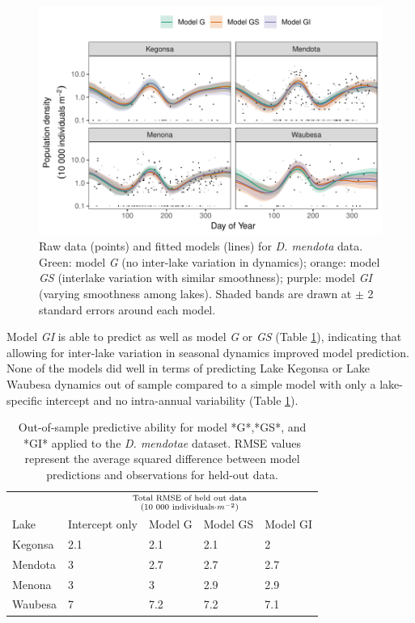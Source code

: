 \documentclass[12pt]{article}
\begin{document}
\begin{figure}
\centering
\includegraphics{../figures/zoo_daph_plot-1.pdf}
\caption{\label{fig:daph_smooth}Raw data (points) and fitted models
(lines) for \textit{D. mendota} data. Green: model \emph{G} (no
inter-lake variation in dynamics); orange: model \emph{GS} (interlake
variation with similar smoothness); purple: model \emph{GI} (varying
smoothness among lakes). Shaded bands are drawn at \(\pm\) 2 standard
errors around each model.}
\end{figure}

Model \emph{GI} is able to predict as well as model \emph{G} or
\emph{GS} (Table \ref{tab:zoo_daph_outofsample_kable}), indicating that
allowing for inter-lake variation in seasonal dynamics improved model
prediction. None of the models did well in terms of predicting Lake
Kegonsa or Lake Waubesa dynamics out of sample compared to a simple
model with only a lake-specific intercept and no intra-annual
variability (Table \ref{tab:zoo_daph_outofsample_kable}).

\begin{table}[t]

\caption{\label{tab:zoo_daph_outofsample_kable}Out-of-sample predictive ability for model *G*,*GS*, and *GI* applied to the \textit{D. mendotae} dataset. RMSE values represent the average squared difference between model predictions and observations for held-out data.}
\centering
\begin{tabular}{lllll}
\toprule
\multicolumn{1}{c}{ } & \multicolumn{4}{c}{\Large{${\text{Total RMSE of held out data}}\atop{(\text{10 000 individuals}\cdot m^{-2})}$}} \\
\cmidrule(l{2pt}r{2pt}){2-5}
Lake & Intercept only & Model G & Model GS & Model GI\\
\midrule
Kegonsa & 2.1 & 2.1 & 2.1 & 2\\
Mendota & 3 & 2.7 & 2.7 & 2.7\\
Menona & 3 & 3 & 2.9 & 2.9\\
Waubesa & 7 & 7.2 & 7.2 & 7.1\\
\bottomrule
\end{tabular}
\end{table}
\end{document}
